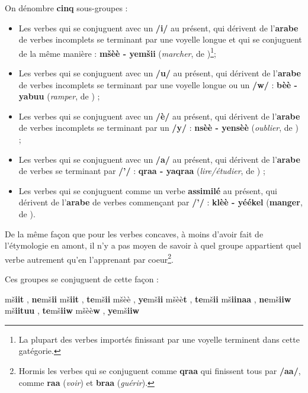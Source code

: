 On dénombre \textbf{cinq} sous-groupes : 

\begin{itemize}
    \item Les verbes qui se conjuguent avec un \textbf{/i/} au présent, qui dérivent de l'\textbf{arabe} de verbes incomplets se terminant par une voyelle longue et qui se conjuguent de la même manière : \textbf{m\v{s}èè - yem\v{s}ii} (\textit{marcher}, de )\footnote{La plupart des verbes importés finissant par une voyelle terminent dans cette gatégorie.};
    \item Les verbes qui se conjuguent avec un \textbf{/u/} au présent, qui dérivent de l'\textbf{arabe} de verbes incomplets se terminant par une voyelle longue ou un \textbf{/w/} : \textbf{\textcrh bèè - ya\textcrh buu} (\textit{ramper}, de ) ;
    \item Les verbes qui se conjuguent avec un \textbf{/è/} au présent, qui dérivent de l'\textbf{arabe} de verbes incomplets se terminant par un \textbf{/y/} : \textbf{nsèè - yensèè} (\textit{oublier}, de ) ;
    \item Les verbes qui se conjuguent avec un \textbf{/a/} au présent, qui dérivent de l'\textbf{arabe} de verbes se terminant par \textbf{/'/} : \textbf{qraa - yaqraa} (\textit{lire/étudier}, \linebreak de ) ; 
    \item Les verbes qui se conjuguent comme un verbe \textbf{assimilé} au présent, qui dérivent de l'\textbf{arabe} de verbes commençant par \textbf{/'/} : \textbf{klèè - yéékel} (\textbf{manger}, de ).
\end{itemize}

De la même façon que pour les verbes concaves, à moins d'avoir fait de l'étymologie en amont, il n'y a pas moyen de savoir à quel groupe appartient quel verbe autrement qu'en l'apprenant par coeur\footnote{Hormis les verbes qui se conjuguent comme \textbf{qraa} qui finissent tous par \textbf{/aa/}, comme \textbf{raa} (\textit{voir}) et \textbf{braa} (\textit{guérir}).}. 

Ces groupes se conjuguent de cette façon :

    {m\v{s}\textbf{iit} , \textbf{ne}m\v{s}\textbf{ii}}
    {m\v{s}\textbf{iit} , \textbf{te}m\v{s}\textbf{ii}}
    {m\v{s}èè , \textbf{ye}m\v{s}\textbf{ii}}
    {m\v{s}èè\textbf{t} , \textbf{te}m\v{s}\textbf{ii}}
    {m\v{s}\textbf{iinaa} , \textbf{ne}m\v{s}\textbf{iiw}}
    {m\v{s}\textbf{iituu} , \textbf{te}m\v{s}\textbf{iiw}}
    {m\v{s}èè\textbf{w} , \textbf{ye}m\v{s}\textbf{iiw}}

